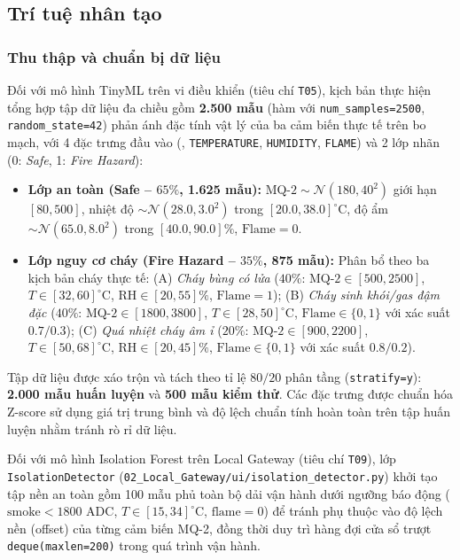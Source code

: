 \subsection{Trí tuệ nhân tạo}
\label{subsec:tri-tue-nhan-tao}

\subsubsection{Thu thập và chuẩn bị dữ liệu}
\label{subsubsec:ai-du-lieu}

Đối với mô hình TinyML trên vi điều khiển (tiêu chí \texttt{T05}), kịch bản  thực hiện tổng hợp tập dữ liệu đa chiều gồm \textbf{2.500 mẫu} (hàm  với \texttt{num\_samples=2500}, \texttt{random\_state=42}) phản ánh đặc tính vật lý của ba cảm biến thực tế trên bo mạch, với 4 đặc trưng đầu vào (, \texttt{TEMPERATURE}, \texttt{HUMIDITY}, \texttt{FLAME}) và 2 lớp nhãn (0: \textit{Safe}, 1: \textit{Fire Hazard}):
\begin{itemize}[leftmargin=*, itemsep=2pt]
  \item \textbf{Lớp an toàn (Safe -- $65\%$, 1.625 mẫu):} $\text{MQ-2} \sim \mathcal{N}(180, 40^2)$ giới hạn $[80, 500]$, nhiệt độ $\sim \mathcal{N}(28.0, 3.0^2)$ trong $[20.0, 38.0]^\circ\text{C}$, độ ẩm $\sim \mathcal{N}(65.0, 8.0^2)$ trong $[40.0, 90.0]\%$, $\text{Flame} = 0$.
  \item \textbf{Lớp nguy cơ cháy (Fire Hazard -- $35\%$, 875 mẫu):} Phân bổ theo ba kịch bản cháy thực tế: (A) \textit{Cháy bùng có lửa} ($40\%$: $\text{MQ-2} \in [500, 2500]$, $T \in [32, 60]^\circ\text{C}$, $\text{RH} \in [20, 55]\%$, $\text{Flame}=1$); (B) \textit{Cháy sinh khói/gas đậm đặc} ($40\%$: $\text{MQ-2} \in [1800, 3800]$, $T \in [28, 50]^\circ\text{C}$, $\text{Flame} \in \{0,1\}$ với xác suất $0.7/0.3$); (C) \textit{Quá nhiệt cháy âm ỉ} ($20\%$: $\text{MQ-2} \in [900, 2200]$, $T \in [50, 68]^\circ\text{C}$, $\text{RH} \in [20, 45]\%$, $\text{Flame} \in \{0,1\}$ với xác suất $0.8/0.2$).
\end{itemize}

Tập dữ liệu được xáo trộn và tách theo tỉ lệ $80/20$ phân tầng (\texttt{stratify=y}): \textbf{2.000 mẫu huấn luyện} và \textbf{500 mẫu kiểm thử}. Các đặc trưng được chuẩn hóa Z-score sử dụng giá trị trung bình và độ lệch chuẩn tính hoàn toàn trên tập huấn luyện nhằm tránh rò rỉ dữ liệu.

Đối với mô hình Isolation Forest trên Local Gateway (tiêu chí \texttt{T09}), lớp \texttt{IsolationDetector} (\texttt{02\_Local\_Gateway/ui/isolation\_detector.py}) khởi tạo tập nền an toàn gồm 100 mẫu phủ toàn bộ dải vận hành dưới ngưỡng báo động ($\text{smoke} < 1800\text{ ADC}$, $T \in [15, 34]^\circ\text{C}$, $\text{flame}=0$) để tránh phụ thuộc vào độ lệch nền (offset) của từng cảm biến MQ-2, đồng thời duy trì hàng đợi cửa sổ trượt \texttt{deque(maxlen=200)} trong quá trình vận hành.

